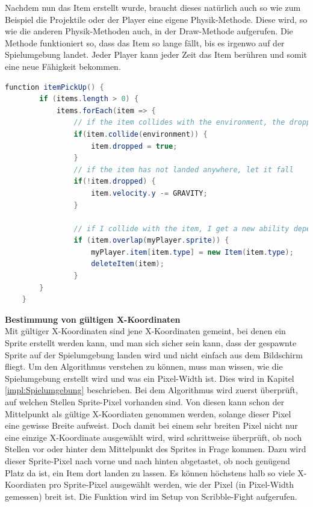 Nachdem nun das Item erstellt wurde, braucht dieses natürlich auch so wie zum Beispiel die Projektile oder der Player eine eigene Physik-Methode. Diese wird, so wie die anderen Physik-Methoden auch, in der Draw-Methode aufgerufen.
Die Methode funktioniert so, dass das Item so lange fällt, bis es irgenwo auf der Spielumgebung landet. Jeder Player kann jeder Zeit das Item berühren und somit eine neue Fähigkeit bekommen.

\begin{lstlisting}[caption=Item-Physik,language=Java,label=lst:impl:itemPhy]
    function itemPickUp() {
        if (items.length > 0) {
            items.forEach(item => {
                // if the item collides with the environment, the dropped-attribute becomes true
                if(item.collide(environment)) {
                    item.dropped = true;
                }
                // if the item has not landed anywhere, let it fall 
                if(!item.dropped) {
                    item.velocity.y -= GRAVITY;
                }
    
                // if I collide with the item, I get a new ability depending on the type of the item and the item gets deleted
                if (item.overlap(myPlayer.sprite)) {
                    myPlayer.item[item.type] = new Item(item.type);
                    deleteItem(item);
                }
        }
    }
    \end{lstlisting}

\textbf{Bestimmung von gültigen X-Koordinaten} \label{impl:xCoordinates}
\\
Mit gültiger X-Koordinaten sind jene X-Koordinaten gemeint, bei denen ein Sprite erstellt werden kann, und man sich sicher sein kann, dass der gespawnte Sprite auf der Spielumgebung landen wird und nicht einfach aus dem Bildschirm fliegt.
Um den Algorithmus verstehen zu können, muss man wissen, wie die Spielumgebung erstellt wird und was ein Pixel-Width ist. Dies wird in Kapitel \ref{impl:Spielumgebung} beschrieben.
Bei dem Algorithmus wird zuerst überprüft, auf welchen Stellen Sprite-Pixel vorhanden sind. Von diesen kann schon der Mittelpunkt als gültige X-Koordiaten genommen werden, solange dieser Pixel eine gewisse Breite aufweist. 
Doch damit bei einem sehr breiten Pixel nicht nur eine einzige X-Koordinate ausgewählt wird, wird schrittweise überprüft, ob noch Stellen vor oder hinter dem Mittelpunkt des Sprites in Frage kommen.
Dazu wird dieser Sprite-Pixel nach vorne und nach hinten abgetastet, ob noch genügend Platz da ist, ein Item dort landen zu lassen. 
Es können höchstens halb so viele X-Koordiaten pro Sprite-Pixel ausgewählt werden, wie der Pixel (in Pixel-Width gemessen) breit ist. 
Die Funktion wird im Setup von Scribble-Fight aufgerufen. 

